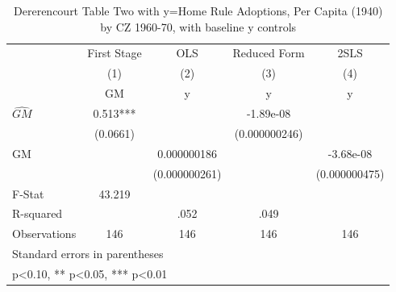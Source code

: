 \begin{table}[htbp]\centering
\def\sym#1{\ifmmode^{#1}\else\(^{#1}\)\fi}
\caption{Dererencourt Table Two with y=Home Rule Adoptions, Per Capita (1940) by CZ 1960-70, with baseline y controls}
\begin{tabular}{l*{4}{c}}
\toprule
                    & First Stage   &         OLS   &Reduced Form   &        2SLS   \\
                    &\multicolumn{1}{c}{(1)}&\multicolumn{1}{c}{(2)}&\multicolumn{1}{c}{(3)}&\multicolumn{1}{c}{(4)}\\
                    &\multicolumn{1}{c}{GM}&\multicolumn{1}{c}{y}&\multicolumn{1}{c}{y}&\multicolumn{1}{c}{y}\\
\midrule
$\hat{GM}$          &       0.513***&               &   -1.89e-08   &               \\
                    &    (0.0661)   &               &(0.000000246)   &               \\
\addlinespace
GM                  &               & 0.000000186   &               &   -3.68e-08   \\
                    &               &(0.000000261)   &               &(0.000000475)   \\
\midrule
F-Stat              &      43.219   &               &               &               \\
R-squared           &               &        .052   &        .049   &               \\
Observations        &         146   &         146   &         146   &         146   \\
\bottomrule
\multicolumn{5}{l}{\footnotesize Standard errors in parentheses}\\
\multicolumn{5}{l}{\footnotesize * p<0.10, ** p<0.05, *** p<0.01}\\
\end{tabular}
\end{table}

